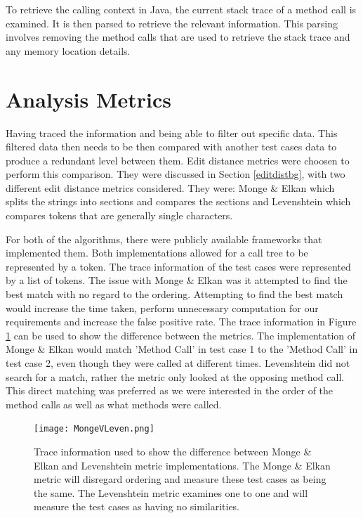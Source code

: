 To retrieve the calling context in Java, the current stack trace of a method call is examined. It is then parsed to retrieve the relevant information. This parsing involves removing the method calls that are used to retrieve the stack trace and any memory location details. 

\section{Analysis Metrics}
\label{S:metrics}
Having traced the information and being able to filter out specific data. This filtered data then needs to be then compared with another test cases data to produce a redundant level between them. Edit distance metrics were choosen to perform this comparison. They were discussed in Section \ref{editdistbg}, with two different edit distance metrics considered. They were: Monge \& Elkan \cite{monge1997efficient} which splits the strings into sections and compares the sections and Levenshtein \cite{levenshtein1966binary} which compares tokens that are generally single characters. 

For both of the algorithms, there were publicly available frameworks that implemented them. Both implementations allowed for a call tree to be represented by a token. The trace information of the test cases were represented by a list of tokens. The issue with Monge \& Elkan was it attempted to find the best match with no regard to the ordering. Attempting to find the best match would increase the time taken, perform unnecessary computation for our requirements and increase the false positive rate. The trace information in Figure \ref{fig:mongevleven} can be used to show the difference between the metrics. The implementation of Monge \& Elkan would match 'Method Call' in test case 1 to the 'Method Call' in test case 2, even though they were called at different times. Levenshtein did not search for a match, rather the metric only looked at the opposing method call. This direct matching was preferred as we were interested in the order of the method calls as well as what methods were called.

\begin{figure}[h]
\begin{center}
\texttt{[image: MongeVLeven.png]}
\end{center}
\caption{Trace information used to show the difference between Monge \& Elkan and Levenshtein metric implementations. The Monge \& Elkan metric will disregard ordering and measure these test cases as being the same. The Levenshtein metric examines one to one and will measure the test cases as having no similarities.}
\label{fig:mongevleven}
\end{figure}

